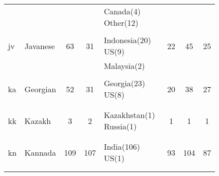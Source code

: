 \begin{figure}[h]
\begin{tabular}{llcclccc}
&&&&Canada(4) Other(12) &&&\\
&&&&&&&\\
jv&Javanese&63&31&Indonesia(20) US(9) &22&45&25\\
&&&&Malaysia(2) &&&\\
&&&&&&&\\
ka&Georgian&52&31&Georgia(23) US(8) &20&38&27\\
&&&&&&&\\
&&&&&&&\\
kk&Kazakh&3&2&Kazakhstan(1) Russia(1) &1&1&1\\
&&&&&&&\\
&&&&&&&\\
kn&Kannada&109&107&India(106) US(1) &93&104&87\\
&&&&&&&\\
&&&&&&&\\
\end{tabular}
\end{figure}
\clearpage
